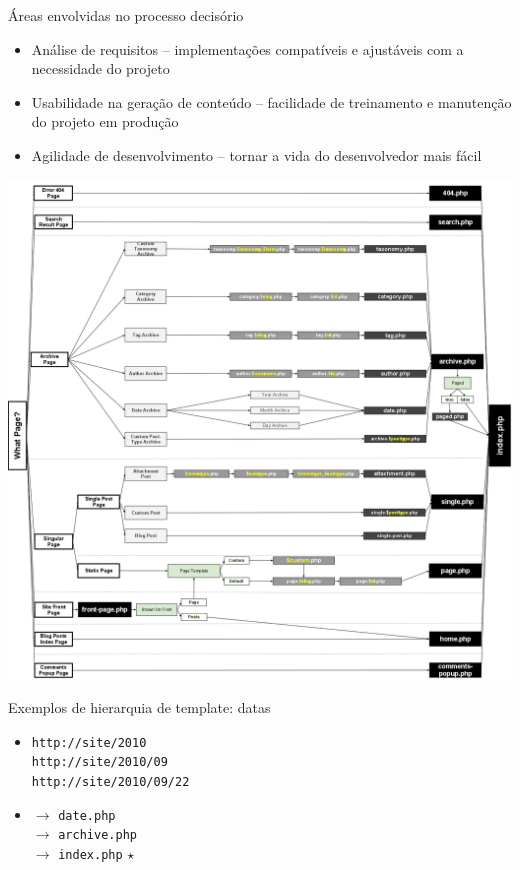 \documentclass{beamer}
\begin{document}
\begin{frame}{Áreas envolvidas no processo decisório}
\begin{itemize}
  \pause \item Análise de requisitos -- implementações compatíveis e ajustáveis
    com a necessidade do projeto
  \pause \item Usabilidade na geração de conteúdo -- facilidade de treinamento
    e manutenção do projeto em produção
  \pause \item Agilidade de desenvolvimento -- tornar a vida do desenvolvedor
    mais fácil
\end{itemize}
\end{frame}

\begin{frame}
\begin{center}
  \includegraphics[height=0.9\textheight]{./img/template-hierarchy.png}
\end{center}
\end{frame}

\begin{frame}{Exemplos de hierarquia de template: datas}
\begin{itemize}
  \pause \item \texttt{http://site/2010} \\
    \pause \texttt{http://site/2010/09} \\
    \pause \texttt{http://site/2010/09/22}
  \pause \item $\rightarrow$ \texttt{date.php} \\
    \pause $\rightarrow$ \texttt{archive.php} \\
    \pause $\rightarrow$ \texttt{index.php} $\star$
\end{itemize}
\end{frame}
\end{document}
